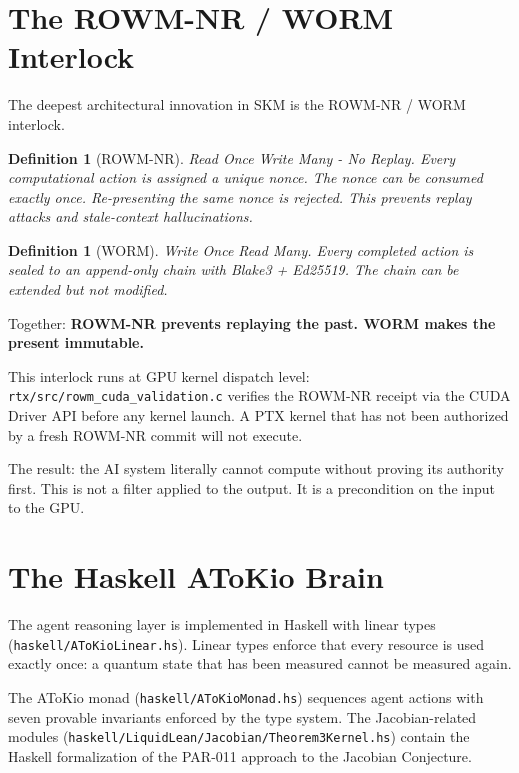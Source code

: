\documentclass[11pt,a4paper]{article}
\newtheorem{definition}[theorem]{Definition}
\begin{document}
\section{The ROWM-NR / WORM Interlock}

The deepest architectural innovation in SKM is the ROWM-NR / WORM
interlock.

\begin{definition}[ROWM-NR]
Read Once Write Many - No Replay. Every computational action is
assigned a unique nonce. The nonce can be consumed exactly once.
Re-presenting the same nonce is rejected. This prevents replay attacks
and stale-context hallucinations.
\end{definition}

\begin{definition}[WORM]
Write Once Read Many. Every completed action is sealed to an
append-only chain with Blake3 + Ed25519. The chain can be extended
but not modified.
\end{definition}

Together: \textbf{ROWM-NR prevents replaying the past. WORM makes the
present immutable.}

This interlock runs at GPU kernel dispatch level:
\texttt{rtx/src/rowm\_cuda\_validation.c} verifies the ROWM-NR receipt
via the CUDA Driver API before any kernel launch. A PTX kernel that has
not been authorized by a fresh ROWM-NR commit will not execute.

The result: the AI system literally cannot compute without proving its
authority first. This is not a filter applied to the output. It is a
precondition on the input to the GPU.

\section{The Haskell AToKio Brain}

The agent reasoning layer is implemented in Haskell with linear types
(\texttt{haskell/AToKioLinear.hs}). Linear types enforce that every
resource is used exactly once: a quantum state that has been measured
cannot be measured again.

The AToKio monad (\texttt{haskell/AToKioMonad.hs}) sequences agent
actions with seven provable invariants enforced by the type system.
The Jacobian-related modules
(\texttt{haskell/LiquidLean/Jacobian/Theorem3Kernel.hs}) contain the
Haskell formalization of the PAR-011 approach to the Jacobian Conjecture.
\end{document}
